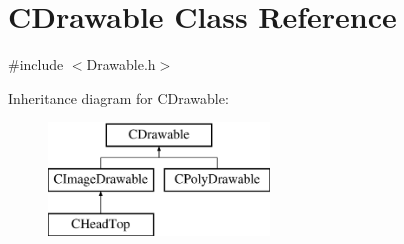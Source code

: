 \hypertarget{class_c_drawable}{}\section{C\+Drawable Class Reference}
\label{class_c_drawable}


{\ttfamily \#include $<$Drawable.\+h$>$}

Inheritance diagram for C\+Drawable\+:\begin{figure}[H]
\begin{center}
\leavevmode
\includegraphics[height=3.000000cm]{class_c_drawable}
\end{center}
\end{figure}
